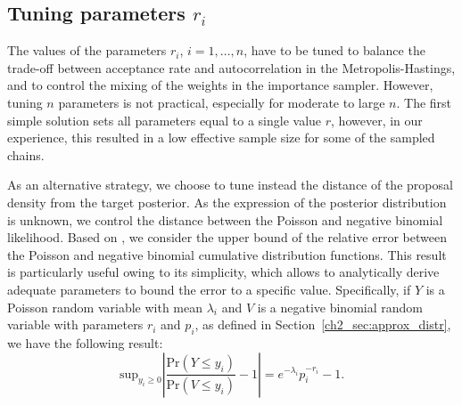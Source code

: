 \subsection{Tuning parameters $r_i$}
\label{sec:tuning_param}

The values of the parameters $r_i$, $i=1,\dots,n$, have to be tuned to balance the trade-off between acceptance rate and autocorrelation in the Metropolis-Hastings, and to control the mixing of the weights in the importance sampler. However, tuning $n$ parameters is not practical, especially for moderate to large $n$.
The first simple solution sets all  parameters equal to a single value $r$, however, in our experience, this resulted in a low effective sample size for some of the sampled chains.

As an alternative strategy, we choose to tune instead the distance of the proposal density from the target posterior.
As the expression of the posterior distribution is unknown, we control the distance between the Poisson and negative binomial likelihood. %
Based on \textcite{Teerapabolarn2012}, we consider the upper bound of the relative error between the Poisson and negative binomial cumulative distribution functions. This result is particularly useful owing to its simplicity, which allows to analytically derive adequate parameters to bound the error to a specific value. Specifically, if $Y$ is a Poisson random variable with mean $\lambda_i$ and $V$ is a negative binomial random variable with parameters $r_i$ and $p_i$, as defined in Section~\ref{ch2_sec:approx_distr}, we have the following result:
\begin{equation*}
\mathrm{sup}_{y_i\geq 0} \left\lvert \frac{\mbox{Pr}(Y\leq y_i)}{\mbox{Pr}(V\leq y_i)} -1 \right\rvert = e^{-\lambda_i} p_i^{-r_i} - 1.
\end{equation*}

